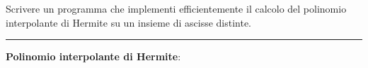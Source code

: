 Scrivere un programma che implementi efficientemente il calcolo del polinomio interpolante di Hermite su un insieme di ascisse distinte.

\hspace*{\fill}
\par\noindent\rule{\textwidth}{0.4pt}
\hspace*{\fill}

\textbf{Polinomio interpolante di Hermite}:

